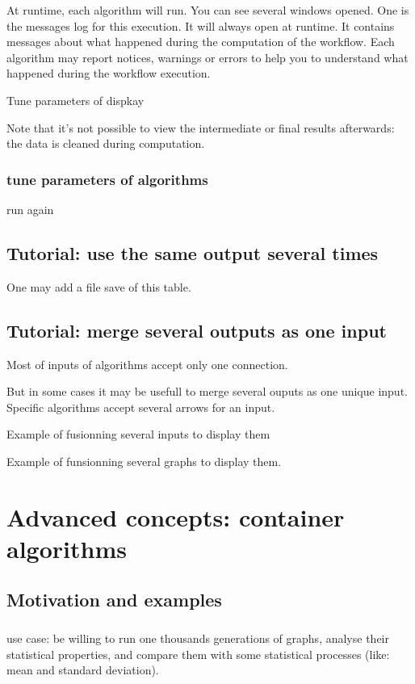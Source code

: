 \documentclass[a4paper,10pt]{book}
\begin{document}
At runtime, each algorithm will run. You can see several windows opened.
One is the messages log for this execution. It will always open at runtime. It contains messages about what happened during the computation of the workflow. Each algorithm may report notices, warnings or errors to help you to understand what happened during the workflow execution.

Tune parameters of dispkay

Note that it's not possible to view the intermediate or final results afterwards: the data is cleaned during computation.

\subsection{tune parameters of algorithms}

run again




\section{Tutorial: use the same output several times}

One may add a file save of this table.

\section{Tutorial: merge several outputs as one input}

Most of inputs of algorithms accept only one connection. 

But in some cases it may be usefull to merge several ouputs as one unique input.
Specific algorithms accept several arrows for an input. 

Example of fusionning several inputs to display them

Example of funsionning several graphs to display them.




\chapter{Advanced concepts: container algorithms}

\section{Motivation and examples}

\paragraph*{}
use case: be willing to run one thousands generations of graphs, analyse their statistical properties, and compare them with some statistical processes (like: mean and standard deviation).
\end{document}
